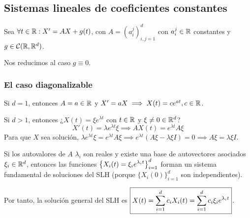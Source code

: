 
\subsection{Sistemas lineales de coeficientes constantes}

Sea $\forall t \in \mathbb{R} : X'=AX + g(t)$, con $A =\left(a_i^j\right)_{i,j=1}^d$ con $a_i^j \in \mathbb{R}$ constantes y $g \in \mathcal{C}(\mathbb{R}, \mathbb{R}^d)$.

Nos reducimos al caso $g\equiv 0$.
\subsubsection{El caso diagonalizable}


Si $d=1$, entonces $A = a \in \mathbb{R}$ y $X' = aX \implies X(t) = c e^{at}, c\in \mathbb{R}$.

Si $d>1$, entonces ¿$X(t)=\xi e^{\lambda t}$ con $t \in \mathbb{R}$ y $\xi \ne 0 \in \mathbb{R}^d$?
\[X'(t) = \lambda e^{\lambda t} \xi \implies AX(t) = e^{\lambda t} A\xi\]
Para que $X$ sea solución, $\lambda e^{\lambda t} \xi = e^{\lambda t} A\xi \implies e^{\lambda t} \left(A\xi - \lambda \xi I\right) = 0 \implies A\xi = \lambda \xi I$.

Si los autovalores de $A$ $\lambda_i$ son reales y existe una base de autovectores asociados $\xi_i\in\mathbb{R}^d$, entonces las funciones $\displaystyle \left\{X_i(t) = \xi_i e^{\lambda_i t}\right\}_{i=1}^d$ forman un sistema fundamental de soluciones del SLH (porque $\{X_i(0)\}_{i=1}^d$ son independientes).

Por tanto, la solución general del SLH es $\displaystyle \boxed{X(t) = \sum_{i=1}^d c_i X_i(t) =  \sum_{i=1}^{d} c_i \xi_i e^{\lambda_i t}}$.

